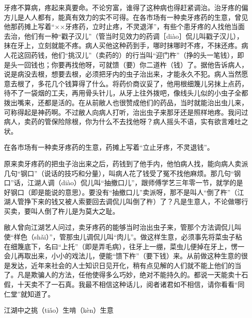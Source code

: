 \documentclass[12pt,UTF8]{ctexbook}
\begin{document}
牙疼不算病，疼起来真要命。不论穷富，谁得了这种病也得赶紧调治。治牙疼的偏方儿是人人都有，能真有效力的实不可得。在各市场有一种卖牙疼药的生意，曾见他那药摊上写着“××牙疼药，立时止疼，不灵退洋”，有些个患牙疼的人找他当面去治，他们有一种“戳子汉儿”（管当时见效力的药调［diào］侃儿叫戳子汉儿），抹在牙上，立刻就能不疼。病人买他这种药到手，哪时抹哪时不疼，不抹还疼。病人花这回药钱，他们“挑汉儿”（卖药的）的行当叫“迎门杵”（挣的头一笔钱），即是头一回钱也；你要再找他呀，可就馈（要）你二道杵（钱）了。据他告诉病人，说是病没去根，想要去根，必须把牙内的虫子治出来，才能永久不犯。病人当然愿意去根了，多花几个钱算得了什么。将药价商议妥了，他用根细篾儿另抹上点药，待不了一袋烟的工夫，再用骨头针儿，从牙上往外拨吧，像线头儿似的小虫子全都拨出嘴来，还都是活的。在从前敝人也很赞成他们的药品，当时就能治出虫儿来，可称得起是神药啊。不过敝人向病人打听，治出虫子来那牙还是照样地疼。我问过病人，卖药的管保险除根，你为什么不去找他呀？病人摇头不语，实有欲言难吐之状。

在各市场有一种卖牙疼药的生意，药摊上写着“立止牙疼，不灵退钱”。



原来卖牙疼药的把虫子治出来之后，药钱到了他手内，他怕病人找，能向病人卖派几句“钢口”（说话的技巧和分量），叫病人花了钱受了冤不找他麻烦。那几句“钢口”话，江湖人调（diào）侃儿叫“抽撤口儿”，跟师傅学艺三年零一节，就学的是好钢口（即是能说的意思）。要没有“抽撤口儿”卖派呀，那不是叫人“倒了杵”（江湖人管挣下来的钱又被人索要回去调侃儿叫倒了杵）了？凡是生意人，不论做哪行买卖，要叫人倒了杵儿是为莫大之耻。

敝人曾向江湖艺人问过，卖牙疼药的能够当时治出虫子来，管那个方法调侃儿叫使“样色（shǎi）”，管那虫儿调侃儿叫“肉儿”。做这样生意，必须事先将菜虫子粘在细篾底下，名曰“上托”（即是弄毛病），往牙上一绷，菜虫儿便掉在牙上，愣一会儿再取出来，小小的戏法儿，便能“馈下杵”（要下钱）来。从前做这种生意的很是发达，近年来社会的人士知识日见开化，稍有点见解的人们就不能上他们的当了。凡是欺骗人的方法，任他使得多么巧妙，绝对不能持久的。都说一天能卖十石假，十天卖不了一石真。我最不相信这种话儿，阅者诸君如不相信，请你看看“同仁堂”就知道了。





江湖中之挑（tiǎo）生啃（kèn）生意
\end{document}
